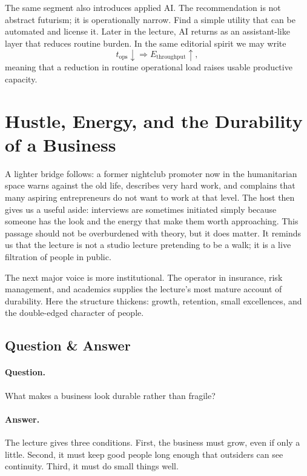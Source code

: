 The same segment also introduces applied AI. The recommendation is not abstract futurism; it is operationally narrow. Find a simple utility that can be automated and license it. Later in the lecture, AI returns as an assistant-like layer that reduces routine burden. In the same editorial spirit we may write
\begin{equation}
t_{\text{ops}}\downarrow \Rightarrow E_{\text{throughput}}\uparrow,
\end{equation}
meaning that a reduction in routine operational load raises usable productive capacity.

\section{Hustle, Energy, and the Durability of a Business}

A lighter bridge follows: a former nightclub promoter now in the humanitarian space warns against the old life, describes very hard work, and complains that many aspiring entrepreneurs do not want to work at that level. The host then gives us a useful aside: interviews are sometimes initiated simply because someone has the look and the energy that make them worth approaching. This passage should not be overburdened with theory, but it does matter. It reminds us that the lecture is not a studio lecture pretending to be a walk; it is a live filtration of people in public.

The next major voice is more institutional. The operator in insurance, risk management, and academics supplies the lecture's most mature account of durability. Here the structure thickens: growth, retention, small excellences, and the double-edged character of people.

\subsection{Question \& Answer}

\paragraph{Question.} What makes a business look durable rather than fragile?

\paragraph{Answer.} The lecture gives three conditions. First, the business must grow, even if only a little. Second, it must keep good people long enough that outsiders can see continuity. Third, it must do small things well.

